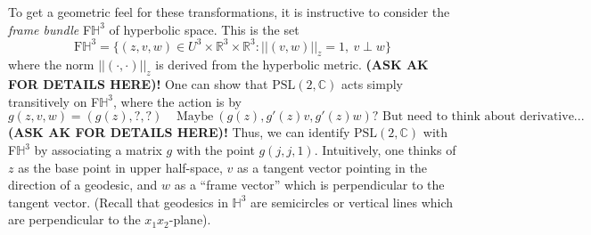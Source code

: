 \documentclass[]{article}
\begin{document}
To get a geometric feel for these transformations, it is instructive to consider the \textit{frame bundle} F$\mathbb{H}^3$ of hyperbolic space.
This is the set
$$
\text{F}\mathbb{H}^3 = \{ (z, v, w) \in U^3 \times \mathbb{R}^3 \times \mathbb{R}^3 : ||(v, w)||_z = 1, ~ v \perp w \}
$$
where the norm $||(\cdot, \cdot)||_z$ is derived from the hyperbolic metric.
\textbf{(ASK AK FOR DETAILS HERE)!}
One can show that $\text{PSL}(2, \mathbb{C})$ acts simply transitively on F$\mathbb{H}^3$, where the action is by
$$
g(z, v, w) = (g(z), \textbf{?}, \textbf{?}) ~~~~~ \text{Maybe}~ (g(z), g'(z)v, g'(z)w)\text{? But need to think about derivative...}
$$
\textbf{(ASK AK FOR DETAILS HERE)!}
Thus, we can identify $\text{PSL}(2, \mathbb{C})$ with F$\mathbb{H}^3$ by associating a matrix $g$ with the point $g(j, j, 1)$.
Intuitively, one thinks of $z$ as the base point in upper half-space, $v$ as a tangent vector pointing in the direction of a geodesic, and $w$ as a ``frame vector'' which is perpendicular to the tangent vector.
(Recall that geodesics in $\mathbb{H}^3$ are semicircles or vertical lines which are perpendicular to the $x_1x_2$-plane).
\end{document}
